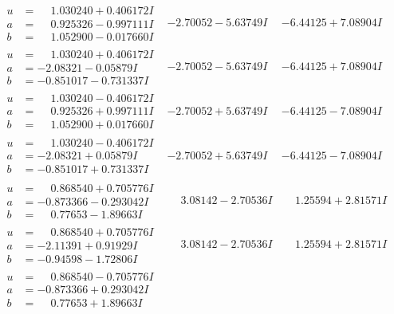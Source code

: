 \documentclass[1p]{elsarticle_modified}
\theoremstyle{definition}
\begin{document}
$$\begin{array}{c|c|c}
\begin{aligned}
u &= \phantom{-}1.030240 + 0.406172 I \\
a &= \phantom{-}0.925326 - 0.997111 I \\
b &= \phantom{-}1.052900 - 0.017660 I\end{aligned}
 & -2.70052 - 5.63749 I & -6.44125 + 7.08904 I \\ \hline\begin{aligned}
u &= \phantom{-}1.030240 + 0.406172 I \\
a &= -2.08321 - 0.05879 I \\
b &= -0.851017 - 0.731337 I\end{aligned}
 & -2.70052 - 5.63749 I & -6.44125 + 7.08904 I \\ \hline\begin{aligned}
u &= \phantom{-}1.030240 - 0.406172 I \\
a &= \phantom{-}0.925326 + 0.997111 I \\
b &= \phantom{-}1.052900 + 0.017660 I\end{aligned}
 & -2.70052 + 5.63749 I & -6.44125 - 7.08904 I \\ \hline\begin{aligned}
u &= \phantom{-}1.030240 - 0.406172 I \\
a &= -2.08321 + 0.05879 I \\
b &= -0.851017 + 0.731337 I\end{aligned}
 & -2.70052 + 5.63749 I & -6.44125 - 7.08904 I \\ \hline\begin{aligned}
u &= \phantom{-}0.868540 + 0.705776 I \\
a &= -0.873366 - 0.293042 I \\
b &= \phantom{-}0.77653 - 1.89663 I\end{aligned}
 & \phantom{-}3.08142 - 2.70536 I & \phantom{-}1.25594 + 2.81571 I \\ \hline\begin{aligned}
u &= \phantom{-}0.868540 + 0.705776 I \\
a &= -2.11391 + 0.91929 I \\
b &= -0.94598 - 1.72806 I\end{aligned}
 & \phantom{-}3.08142 - 2.70536 I & \phantom{-}1.25594 + 2.81571 I \\ \hline\begin{aligned}
u &= \phantom{-}0.868540 - 0.705776 I \\
a &= -0.873366 + 0.293042 I \\
b &= \phantom{-}0.77653 + 1.89663 I\end{aligned}

\end{array}$$
\end{document}
